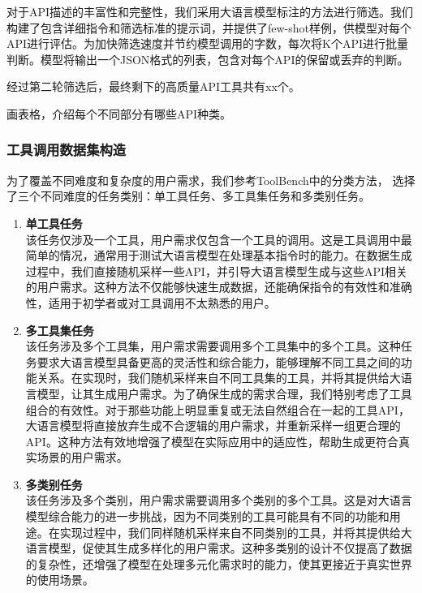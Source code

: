 对于API描述的丰富性和完整性，我们采用大语言模型标注的方法进行筛选。我们构建了包含详细指令和筛选标准的提示词，并提供了few-shot样例，供模型对每个API进行评估。为加快筛选速度并节约模型调用的字数，每次将K个API进行批量判断。模型将输出一个JSON格式的列表，包含对每个API的保留或丢弃的判断。

经过第二轮筛选后，最终剩下的高质量API工具共有xx个。

画表格，介绍每个不同部分有哪些API种类。

\subsubsection{工具调用数据集构造}

为了覆盖不同难度和复杂度的用户需求，我们参考ToolBench中的分类方法，
选择了三个不同难度的任务类别：单工具任务、多工具集任务和多类别任务。

\begin{enumerate}
  \item \textbf{单工具任务} \\
    该任务仅涉及一个工具，用户需求仅包含一个工具的调用。这是工具调用中最简单的情况，通常用于测试大语言模型在处理基本指令时的能力。在数据生成过程中，我们直接随机采样一些API，并引导大语言模型生成与这些API相关的用户需求。这种方法不仅能够快速生成数据，还能确保指令的有效性和准确性，适用于初学者或对工具调用不太熟悉的用户。

  \item \textbf{多工具集任务} \\
    该任务涉及多个工具集，用户需求需要调用多个工具集中的多个工具。这种任务要求大语言模型具备更高的灵活性和综合能力，能够理解不同工具之间的功能关系。在实现时，我们随机采样来自不同工具集的工具，并将其提供给大语言模型，让其生成用户需求。为了确保生成的需求合理，我们特别考虑了工具组合的有效性。对于那些功能上明显重复或无法自然组合在一起的工具API，大语言模型将直接放弃生成不合逻辑的用户需求，并重新采样一组更合理的API。这种方法有效地增强了模型在实际应用中的适应性，帮助生成更符合真实场景的用户需求。

  \item \textbf{多类别任务} \\
    该任务涉及多个类别，用户需求需要调用多个类别的多个工具。这是对大语言模型综合能力的进一步挑战，因为不同类别的工具可能具有不同的功能和用途。在实现过程中，我们同样随机采样来自不同类别的工具，并将其提供给大语言模型，促使其生成多样化的用户需求。这种多类别的设计不仅提高了数据的复杂性，还增强了模型在处理多元化需求时的能力，使其更接近于真实世界的使用场景。

\end{enumerate}

